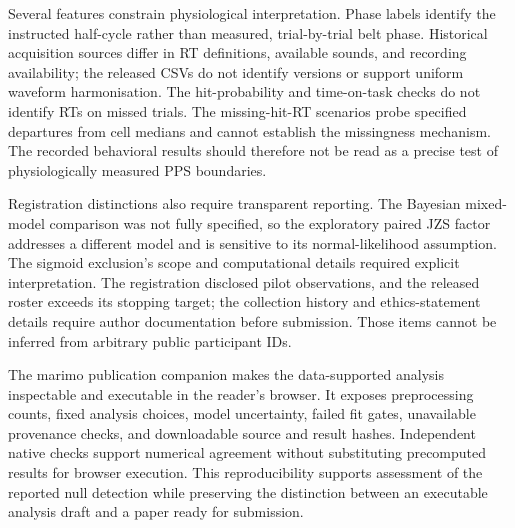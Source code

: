 Several features constrain physiological interpretation. Phase labels identify the instructed half-cycle rather than measured, trial-by-trial belt phase. Historical acquisition sources differ in RT definitions, available sounds, and recording availability; the released CSVs do not identify versions or support uniform waveform harmonisation. The hit-probability and time-on-task checks do not identify RTs on missed trials. The missing-hit-RT scenarios probe specified departures from cell medians and cannot establish the missingness mechanism. The recorded behavioral results should therefore not be read as a precise test of physiologically measured PPS boundaries.

Registration distinctions also require transparent reporting. The Bayesian mixed-model comparison was not fully specified, so the exploratory paired JZS factor addresses a different model and is sensitive to its normal-likelihood assumption. The sigmoid exclusion's scope and computational details required explicit interpretation. The registration disclosed pilot observations, and the released roster exceeds its stopping target; the collection history and ethics-statement details require author documentation before submission. Those items cannot be inferred from arbitrary public participant IDs.

The marimo publication companion makes the data-supported analysis inspectable and executable in the reader's browser. It exposes preprocessing counts, fixed analysis choices, model uncertainty, failed fit gates, unavailable provenance checks, and downloadable source and result hashes. Independent native checks support numerical agreement without substituting precomputed results for browser execution. This reproducibility supports assessment of the reported null detection while preserving the distinction between an executable analysis draft and a paper ready for submission.
